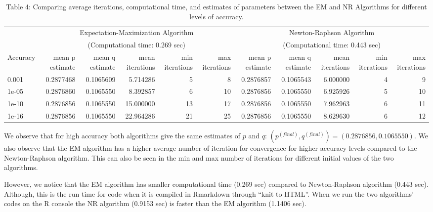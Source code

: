 \documentclass[]{article}
\begin{document}
\begin{table}[t]

\caption{\label{tab:unnamed-chunk-12}Table 4: Comparing average iterations, computational time, and estimates of parameters between the EM and NR Algorithms for different levels of accuracy.}
\centering
\begin{tabular}{l|r|r|r|r|r|r|r|r|r|r}
\hline
\multicolumn{1}{c|}{ } & \multicolumn{5}{c|}{Expectation-Maximization Algorithm} & \multicolumn{5}{c}{Newton-Raphson Algorithm} \\
\cline{2-6} \cline{7-11}
\multicolumn{1}{c|}{ } & \multicolumn{5}{c|}{(Computational time: 0.269 sec)} & \multicolumn{5}{c}{(Computational time: 0.443 sec)} \\
\cline{2-6} \cline{7-11}
Accuracy & mean p estimate & mean q estimate & mean iterations & min iterations & max iterations & mean p estimate & mean q estimate & mean iterations & min iterations & max iterations\\
\hline
0.001 & 0.2877468 & 0.1065609 & 5.714286 & 5 & 8 & 0.2876857 & 0.1065543 & 6.000000 & 4 & 9\\
\hline
1e-05 & 0.2876860 & 0.1065550 & 8.392857 & 6 & 10 & 0.2876856 & 0.1065550 & 6.925926 & 5 & 10\\
\hline
1e-10 & 0.2876856 & 0.1065550 & 15.000000 & 13 & 17 & 0.2876856 & 0.1065550 & 7.962963 & 6 & 11\\
\hline
1e-16 & 0.2876856 & 0.1065550 & 22.964286 & 21 & 25 & 0.2876856 & 0.1065550 & 8.629630 & 6 & 12\\
\hline
\end{tabular}
\end{table}

We observe that for high accuracy both algorithms give the same
estimates of \(p\) and \(q\):
\((p^{(final)}, q^{(final)}) = (0.2876856, 0.1065550)\). We also observe
that the EM algorithm has a higher average number of iteration for
convergence for higher accuracy levels compared to the Newton-Raphson
algorithm. This can also be seen in the min and max number of iterations
for different initial values of the two algorithms.

However, we notice that the EM algorithm has smaller computational time
(0.269 sec) compared to Newton-Raphson algorithm (0.443 sec). Although,
this is the run time for code when it is compiled in Rmarkdown through
``knit to HTML''. When we run the two algorithms' codes on the R console
the NR algorithm (0.9153 sec) is faster than the EM algorithm (1.1406
sec).
\end{document}
